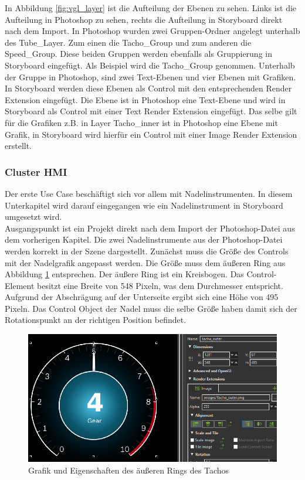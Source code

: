 \newpage

In Abbildung \ref{fig:vgl_layer} ist die Aufteilung der Ebenen zu sehen. Links ist die Aufteilung in Photoshop zu sehen, rechts die Aufteilung in Storyboard direkt nach dem Import. In Photoshop wurden zwei Gruppen-Ordner angelegt unterhalb des \glqq Tube\_Layer\grqq{}. Zum einen die \glqq Tacho\_Group\grqq{} und zum anderen die \glqq Speed\_Group\grqq{}. Diese beiden Gruppen werden ebenfalls als Gruppierung in Storyboard eingefügt. Als Beispiel wird die \glqq Tacho\_Group\grqq{} genommen. Unterhalb der Gruppe in Photoshop, sind zwei Text-Ebenen und vier Ebenen mit Grafiken. In Storyboard werden diese Ebenen als Control mit den entsprechenden Render Extension eingefügt. Die Ebene \grqq{} ist in Photoshop eine Text-Ebene und wird in Storyboard als Control mit einer Text Render Extension eingefügt. Das selbe gilt für die Grafiken z.B. in Layer \glqq Tacho\_inner\grqq{} ist in Photoshop eine Ebene mit Grafik, in Storyboard wird hierfür ein Control mit einer Image Render Extension erstellt.

\subsubsection{Cluster HMI}

Der erste Use Case beschäftigt sich vor allem mit Nadelinstrumenten. In diesem Unterkapitel wird darauf eingegangen wie ein Nadelinstrument in Storyboard umgesetzt wird.\\

Ausgangspunkt ist ein Projekt direkt nach dem Import der Photoshop-Datei aus dem vorherigen Kapitel. Die zwei Nadelinstrumente aus der Photoshop-Datei werden korrekt in der Szene dargestellt. Zunächst muss die Größe des Controls mit der Nadelgrafik angepasst werden. Die Größe muss dem äußeren Ring aus Abbildung \ref{fig:img_prop_outer_tacho} entsprechen. Der äußere Ring ist ein Kreisbogen. Das Control-Element besitzt eine Breite von 548 Pixeln, was dem Durchmesser entspricht. Aufgrund der Abschrägung auf der Unterseite ergibt sich eine Höhe von 495 Pixeln. Das Control Object der Nadel muss die selbe Größe haben damit sich der Rotationspunkt an der richtigen Position befindet.\\

\begin{figure}[htb]
	\centering
	\includegraphics[width=\textwidth]{img/4_hmi_tools/anpassung_indicator}
	\caption{Grafik und Eigenschaften des äußeren Rings des Tachos}
	\label{fig:img_prop_outer_tacho}
\end{figure}

